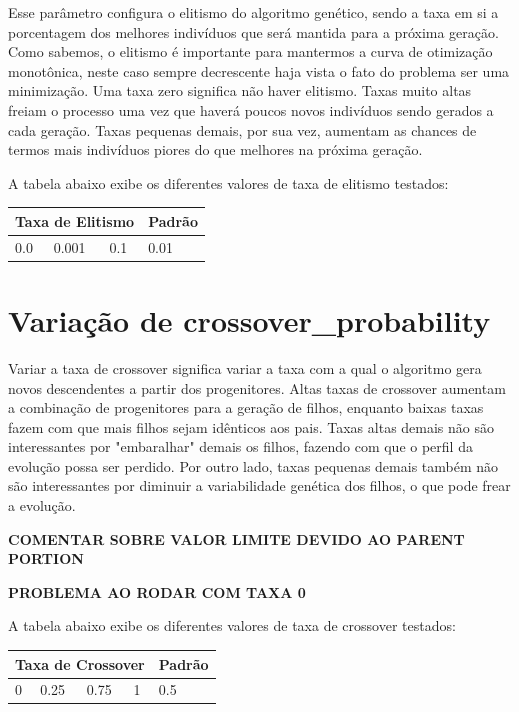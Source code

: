 \documentclass[12pt]{article}
\begin{document}
Esse parâmetro configura o elitismo do algoritmo genético, sendo a taxa em si a porcentagem dos melhores indivíduos que será mantida para a próxima geração. Como sabemos, o elitismo é importante para mantermos a curva de otimização monotônica, neste caso sempre decrescente haja vista o fato do problema ser uma minimização. Uma taxa zero significa não haver elitismo. Taxas muito altas freiam o processo uma vez que haverá poucos novos indivíduos sendo gerados a cada geração. Taxas pequenas demais, por sua vez, aumentam as chances de termos mais indivíduos piores do que melhores na próxima geração.

A tabela abaixo exibe os diferentes valores de taxa de elitismo testados:

\begin{table}[H]
	\centering
	\begin{tabular}{|l|l|l|l|}
		\hline
		\multicolumn{3}{|l|}{Taxa de Elitismo} & Padrão \\ \hline
		0.0    & 0.001    & 0.1    & 0.01    \\ \hline
	\end{tabular}
\end{table}

\section{Variação de crossover\_probability}

Variar a taxa de crossover significa variar a taxa com a qual o algoritmo gera novos descendentes a partir dos progenitores. Altas taxas de crossover aumentam a combinação de progenitores para a geração de filhos, enquanto baixas taxas fazem com que mais filhos sejam idênticos aos pais. Taxas altas demais não são interessantes por "embaralhar" demais os filhos, fazendo com que o perfil da evolução possa ser perdido. Por outro lado, taxas pequenas demais também não são interessantes por diminuir a variabilidade genética dos filhos, o que pode frear a evolução.

\textbf{COMENTAR SOBRE VALOR LIMITE DEVIDO AO PARENT PORTION}

\textbf{PROBLEMA AO RODAR COM TAXA 0}

A tabela abaixo exibe os diferentes valores de taxa de crossover testados:

\begin{table}[H]
	\centering
	\begin{tabular}{|l|l|l|l|l|}
		\hline
		\multicolumn{4}{|l|}{Taxa de Crossover} & Padrão \\ \hline
		0    & 0.25    & 0.75    & 1   &0.5 \\ \hline
	\end{tabular}
\end{table}
\end{document}
